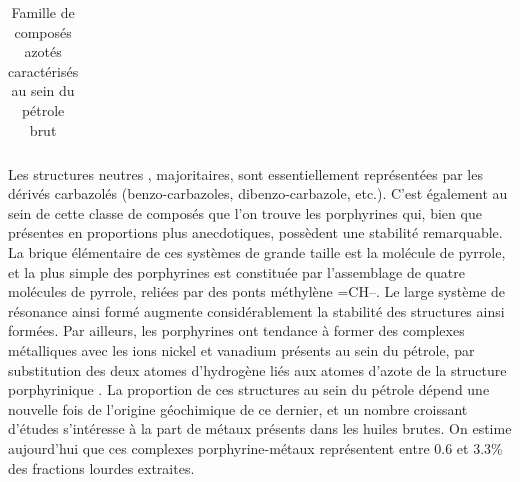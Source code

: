 \begin{table}[h!]
\begin{center}
\begin{tabular}{rl}
			\hline 
		\end{tabular}
	\end{center}
	\caption{Famille de composés azotés caractérisés au sein du pétrole brut}
	\label{tab:azote}
\end{table}


Les structures \og neutres \fg{}, majoritaires, sont essentiellement représentées par les dérivés carbazolés (benzo-carbazoles, dibenzo-carbazole, etc.). C'est également au sein de cette classe de composés que l'on trouve les porphyrines qui, bien que présentes en proportions plus anecdotiques, possèdent une stabilité remarquable. La brique élémentaire de ces systèmes de grande taille est la molécule de pyrrole, et la plus simple des porphyrines est constituée par l'assemblage de quatre molécules de pyrrole, reliées par des ponts méthylène =CH--. Le large système de résonance ainsi formé augmente considérablement la stabilité des structures ainsi formées. Par ailleurs, les porphyrines ont tendance à former des complexes métalliques avec les ions nickel et vanadium présents au sein du pétrole, par substitution des deux atomes d'hydrogène liés aux atomes d'azote de la structure porphyrinique \cite{eyssautier2011insight}. La proportion de ces structures au sein du pétrole dépend une nouvelle fois de l'origine géochimique de ce dernier, et un nombre croissant d'études s'intéresse à la part de métaux présents dans les huiles brutes. On estime aujourd'hui que ces complexes porphyrine-métaux représentent entre 0.6 et 3.3\% des fractions lourdes extraites\cite{speight2004petroleum, merdrignac2007physicochemical}.

